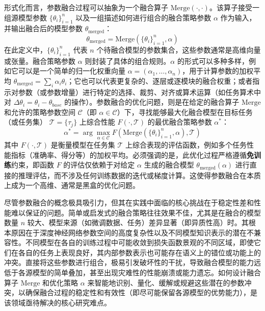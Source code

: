\documentclass[../main.tex]{subfiles}
\begin{document}
形式化而言，参数融合过程可以抽象为一个融合算子 $\text{Merge}(\cdot, \cdot)$。该算子接受一组源模型参数 $\{\theta_i\}_{i=1}^n$ 以及一组描述如何进行组合的融合策略参数 $\alpha$ 作为输入，并输出融合后的模型参数 $\theta_\mathrm{merged}$：
\begin{equation}
	\theta_\mathrm{merged} = \text{Merge}(\{\theta_i\}_{i=1}^n, \alpha) \label{eq:merge_operator}
\end{equation}
在此定义中，$\{\theta_i\}_{i=1}^n$ 代表 $n$ 个待融合模型的参数集合，这些参数通常是高维向量或张量。融合策略参数 $\alpha$ 则封装了具体的组合规则。$\alpha$ 的形式可以多种多样，例如它可以是一个简单的归一化权重向量 $\alpha = (\alpha_1, \dots, \alpha_n)$，用于计算参数的加权平均 $\theta_\mathrm{merged} = \sum_i \alpha_i \theta_i$；它也可以代表更复杂的、逐层或逐模块的融合权重；或者指示对参数（或参数增量）进行特定的选择、裁剪、对齐或算术运算（如任务算术中对 $\Delta \theta_i = \theta_i - \theta_{base}$ 的操作）。参数融合的优化问题，则是在给定的融合算子 $\text{Merge}$ 和允许的策略参数空间 $\mathcal{C}$（即 $\alpha \in \mathcal{C}$）下，寻找能够最大化融合模型在目标任务（或任务集） $\mathcal{T} = \{\tau_j\}$ 上综合性能 $F(\cdot, \mathcal{T})$ 的最优融合策略参数 $\alpha^*$：
\begin{equation}
	\alpha^* = \arg\max_{\alpha \in \mathcal{C}} F(\text{Merge}(\{\theta_i\}_{i=1}^n, \alpha), \mathcal{T}) \label{eq:merge_objective}
\end{equation}
其中 $F(\cdot, \mathcal{T})$ 是衡量模型在任务集 $\mathcal{T}$ 上综合表现的评估函数，例如多个任务性能指标（准确率、得分等）的加权平均。必须强调的是，此优化过程严格遵循\textbf{免训练}约束，即函数 $F$ 的评估仅依赖于对给定 $\alpha$ 生成的融合模型 $\theta_\mathrm{merged}(\alpha)$ 进行直接的推理评估，而不涉及任何训练数据的迭代或梯度计算。这使得参数融合在本质上成为一个高维、通常是黑盒的优化问题。

尽管参数融合的概念极具吸引力，但其在实践中面临的核心挑战在于稳定性差和性能难以保证的问题。简单或启发式的融合策略往往效果不佳，尤其是在融合的模型数量 $n$ 较大、模型来源（如微调数据、任务）差异显著（即异质性高）时。其根本原因在于深度神经网络参数空间的高度复杂性以及不同模型知识表示的潜在不兼容性。不同模型在各自的训练过程中可能收敛到损失函数景观的不同区域，即使它们在各自的任务上表现良好，其内部参数表示也可能存在语义上的错位或功能上的冲突。直接将这些参数进行组合，极易引发破坏性的干扰，导致融合模型的能力远低于各源模型的简单叠加，甚至出现灾难性的性能崩溃或能力遗忘。如何设计融合算子 $\text{Merge}$ 和优化策略 $\alpha$ 来智能地识别、量化、缓解或规避这些潜在的参数冲突，以确保融合过程的稳定性和有效性（即尽可能保留各源模型的优势能力），是该领域亟待解决的核心研究难点。
\end{document}
